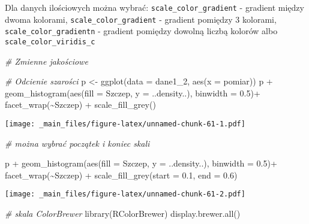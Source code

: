 \documentclass[
]{book}
\newenvironment{Shaded}{\begin{snugshade}}{\end{snugshade}}
\newcommand{\AttributeTok}[1]{\textcolor[rgb]{0.77,0.63,0.00}{#1}}
\newcommand{\CommentTok}[1]{\textcolor[rgb]{0.56,0.35,0.01}{\textit{#1}}}
\newcommand{\FloatTok}[1]{\textcolor[rgb]{0.00,0.00,0.81}{#1}}
\newcommand{\FunctionTok}[1]{\textcolor[rgb]{0.00,0.00,0.00}{#1}}
\newcommand{\NormalTok}[1]{#1}
\newcommand{\OtherTok}[1]{\textcolor[rgb]{0.56,0.35,0.01}{#1}}
\newcommand{\SpecialCharTok}[1]{\textcolor[rgb]{0.00,0.00,0.00}{#1}}
\begin{document}
Dla danych ilościowych można wybrać: \texttt{scale\_color\_gradient} - gradient między dwoma kolorami, \texttt{scale\_color\_gradient} - gradient pomiędzy 3 kolorami, \texttt{scale\_color\_gradientn} - gradient pomiędzy dowolną liczbą kolorów albo \texttt{scale\_color\_viridis\_c}

\begin{Shaded}
\begin{Highlighting}[]
\CommentTok{\# Zmienne jakościowe}

\CommentTok{\# Odcienie szarości}
\NormalTok{p }\OtherTok{\textless{}{-}} \FunctionTok{ggplot}\NormalTok{(}\AttributeTok{data =}\NormalTok{ dane1\_2, }\FunctionTok{aes}\NormalTok{(}\AttributeTok{x =}\NormalTok{ pomiar))}
\NormalTok{p }\SpecialCharTok{+} \FunctionTok{geom\_histogram}\NormalTok{(}\FunctionTok{aes}\NormalTok{(}\AttributeTok{fill =}\NormalTok{ Szczep, }\AttributeTok{y =}\NormalTok{ ..density..), }\AttributeTok{binwidth =} \FloatTok{0.5}\NormalTok{)}\SpecialCharTok{+}
  \FunctionTok{facet\_wrap}\NormalTok{(}\SpecialCharTok{\textasciitilde{}}\NormalTok{Szczep) }\SpecialCharTok{+} \FunctionTok{scale\_fill\_grey}\NormalTok{()}
\end{Highlighting}
\end{Shaded}

\texttt{[image: \_main\_files/figure-latex/unnamed-chunk-61-1.pdf]}

\begin{Shaded}
\begin{Highlighting}[]
\CommentTok{\# można wybrać początek i koniec skali}

\NormalTok{p }\SpecialCharTok{+} \FunctionTok{geom\_histogram}\NormalTok{(}\FunctionTok{aes}\NormalTok{(}\AttributeTok{fill =}\NormalTok{ Szczep, }\AttributeTok{y =}\NormalTok{ ..density..), }\AttributeTok{binwidth =} \FloatTok{0.5}\NormalTok{)}\SpecialCharTok{+}
  \FunctionTok{facet\_wrap}\NormalTok{(}\SpecialCharTok{\textasciitilde{}}\NormalTok{Szczep) }\SpecialCharTok{+} \FunctionTok{scale\_fill\_grey}\NormalTok{(}\AttributeTok{start =} \FloatTok{0.1}\NormalTok{, }\AttributeTok{end =} \FloatTok{0.6}\NormalTok{)}
\end{Highlighting}
\end{Shaded}

\texttt{[image: \_main\_files/figure-latex/unnamed-chunk-61-2.pdf]}

\begin{Shaded}
\begin{Highlighting}[]
\CommentTok{\# skala ColorBrewer}
\FunctionTok{library}\NormalTok{(RColorBrewer)}
\FunctionTok{display.brewer.all}\NormalTok{()}
\end{Highlighting}
\end{Shaded}
\end{document}

